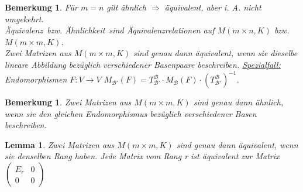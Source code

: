 \documentclass[12pt,a4paper]{article}
\theoremstyle{plain}
\newtheorem{Lemma}[Theorem]{Lemma}
\newtheorem{Bemerkung}[Theorem]{Bemerkung}
\numberwithin{equation}{section}
\begin{document}
\begin{Bemerkung}
Für $m=n$ gilt ähnlich $\Rightarrow$ äquivalent, aber i. A. nicht umgekehrt.\\
\glqq Äquivalenz\grqq\ bzw. \glqq Ähnlichkeit\grqq\ sind Äquivalenzrelationen auf $M(m\times n,K)$ bzw. $M(m\times m,K)$. \\
Zwei Matrizen aus $M(m\times m,K)$ sind genau dann äquivalent, wenn sie dieselbe lineare Abbildung bezüglich verschiedener Basenpaare beschreiben. \underline{Spezialfall:} Endomorphismen $F:V \rightarrow V$ $M_\mathcal{B'}(F)=T^\mathcal{B}_\mathcal{B'}\cdot M_\mathcal{B}(F)\cdot \left(T^\mathcal{B}_\mathcal{B'} \right)^{-1}$.
\end{Bemerkung}
\begin{Bemerkung}
Zwei Matrizen aus $M(m\times m,K)$ sind genau dann ähnlich, wenn sie den gleichen Endomorphismus bezüglich verschiedener Basen beschreiben.
\end{Bemerkung}
\begin{Lemma}
Zwei Matrizen aus $M(m\times m,K)$ sind genau dann äquivalent, wenn sie denselben Rang haben. Jede Matrix vom Rang r ist äquivalent zur Matrix $\left(\begin{matrix} E_r & 0 \\ 0 & 0 \end{matrix} \right)$
\end{Lemma}
\end{document}
